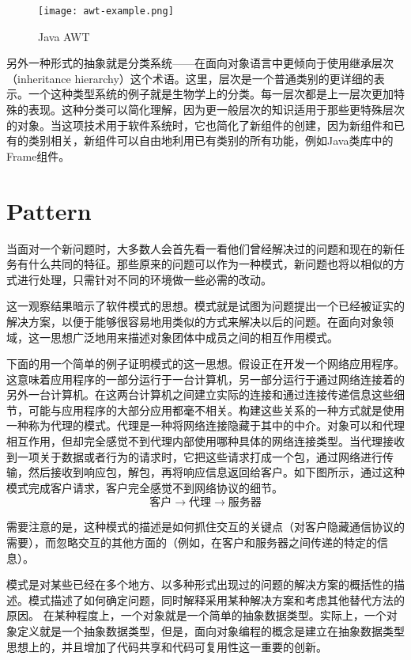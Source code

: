 \begin{figure}[htbp]
\centering
\texttt{[image: awt-example.png]}
\caption{Java AWT}
\label{fig:java-awt-example}
\end{figure}

另外一种形式的抽象就是分类系统——在面向对象语言中更倾向于使用继承层次（inheritance hierarchy）这个术语。这里，层次是一个普通类别的更详细的表示。一个这种类型系统的例子就是生物学上的分类。每一层次都是上一层次更加特殊的表现。这种分类可以简化理解，因为更一般层次的知识适用于那些更特殊层次的对象。当这项技术用于软件系统时，它也简化了新组件的创建，因为新组件和已有的类别相关，新组件可以自由地利用已有类别的所有功能，例如Java类库中的Frame组件。


\chapter{Pattern}

当面对一个新问题时，大多数人会首先看一看他们曾经解决过的问题和现在的新任务有什么共同的特征。那些原来的问题可以作为一种模式，新问题也将以相似的方式进行处理，只需针对不同的环境做一些必需的改动。

这一观察结果暗示了软件模式的思想。模式就是试图为问题提出一个已经被证实的解决方案，以便于能够很容易地用类似的方式来解决以后的问题。在面向对象领域，这一思想广泛地用来描述对象团体中成员之间的相互作用模式。

下面的用一个简单的例子证明模式的这一思想。假设正在开发一个网络应用程序。这意味着应用程序的一部分运行于一台计算机，另一部分运行于通过网络连接着的另外一台计算机。在这两台计算机之间建立实际的连接和通过连接传递信息这些细节，可能与应用程序的大部分应用都毫不相关。构建这些关系的一种方式就是使用一种称为代理的模式。代理是一种将网络连接隐藏于其中的中介。对象可以和代理相互作用，但却完全感觉不到代理内部使用哪种具体的网络连接类型。当代理接收到一项关于数据或者行为的请求时，它把这些请求打成一个包，通过网络进行传输，然后接收到响应包，解包，再将响应信息返回给客户。如下图所示，通过这种模式完成客户请求，客户完全感觉不到网络协议的细节。
\[\mbox{客户}\longrightarrow \mbox{代理} \longrightarrow \mbox{服务器}\]

需要注意的是，这种模式的描述是如何抓住交互的关键点（对客户隐藏通信协议的需要），而忽略交互的其他方面的（例如，在客户和服务器之间传递的特定的信息）。

模式是对某些已经在多个地方、以多种形式出现过的问题的解决方案的概括性的描述。模式描述了如何确定问题，同时解释采用某种解决方案和考虑其他替代方法的原因。
在某种程度上，一个对象就是一个简单的抽象数据类型。实际上，一个对象定义就是一个抽象数据类型，但是，面向对象编程的概念是建立在抽象数据类型思想上的，并且增加了代码共享和代码可复用性这一重要的创新。

